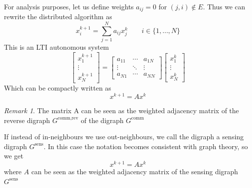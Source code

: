 \documentclass{book}
\theoremstyle{theoremv2}
\theoremstyle{defv2}
\theoremstyle{remark}
\newtheorem*{remark}{Remark}
\theoremstyle{remark}
\theoremstyle{definition}
\theoremstyle{definition}
\begin{document}
For analysis purposes, let us define weights $a_{ij}=0$ for $(j,i)\notin E$. Thus we can rewrite the distributed algorithm as 
\[
    x_i^{k+1}=\displaystyle\sum_{j=1}^{N}a_{ij}x_j^k \qquad i\in\{1,\dots,N\}
\]
This is an LTI autonomous system 
\[
    \begin{bmatrix}
        x_1^{k+1}\\ \vdots \\ x_N^{k+1}
    \end{bmatrix} = \begin{bmatrix}
        a_{11} & \cdots & a_{1N} \\ 
        \vdots & \ddots & \vdots \\
        a_{N1} & \cdots & a_{NN}
    \end{bmatrix} \begin{bmatrix}
        x_1^k \\ \vdots \\ x_N^k
    \end{bmatrix}
\]
Which can be compactly written as  
\[
    x^{k+1} = Ax^k
\]
\begin{remark}
    The matrix A can be seen as the weighted adjacency matrix of the reverse digraph $G^{\text{comm,rev}}$ of the digraph $G^{\text{comm}}$
\end{remark}
If instead of in-neighbours we use out-neighbours, we call the digraph a sensing digraph $G^{\text{sens}}$. In this case the notation becomes consistent with graph theory, so we get 
\[
    x^{k+1} = A x^k
\]
where $A$ can be seen as the weighted adjacency matrix of the sensing digraph $G^{\text{sens}}$
\end{document}
